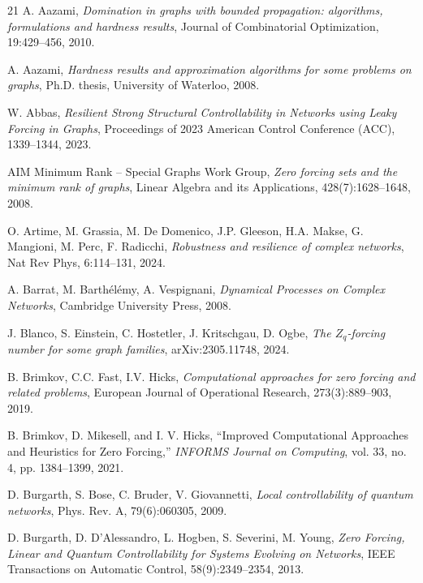 \documentclass[11pt]{article}
\theoremstyle{plain}
\theoremstyle{definition}
\theoremstyle{remark}
\begin{document}
\begin{thebibliography}{21}
A. Aazami, 
\textit{Domination in graphs with bounded propagation: algorithms, formulations and hardness results}, 
Journal of Combinatorial Optimization, 19:429--456, 2010.

A. Aazami, 
\textit{Hardness results and approximation algorithms for some problems on graphs}, 
Ph.D. thesis, University of Waterloo, 2008.

W. Abbas,
\textit{Resilient Strong Structural Controllability in Networks using Leaky Forcing in Graphs}, 
Proceedings of 2023 American Control Conference (ACC), 1339--1344, 2023.

AIM Minimum Rank – Special Graphs Work Group, 
\textit{Zero forcing sets and the minimum rank of graphs}, 
Linear Algebra and its Applications, 428(7):1628--1648, 2008.

O. Artime, M. Grassia, M. De Domenico, J.P. Gleeson, H.A. Makse, G. Mangioni, M. Perc, F. Radicchi,
\textit{Robustness and resilience of complex networks}, 
Nat Rev Phys, 6:114--131, 2024.

A. Barrat, M. Barthélémy, A. Vespignani, 
\textit{Dynamical Processes on Complex Networks}, 
Cambridge University Press, 2008.

J. Blanco, S. Einstein, C. Hostetler, J. Kritschgau, D. Ogbe, 
\textit{The $Z_q$-forcing number for some graph families}, 
arXiv:2305.11748, 2024.

B. Brimkov, C.C. Fast, I.V. Hicks,
\textit{Computational approaches for zero forcing and related problems}, 
European Journal of Operational Research, 273(3):889--903, 2019.

B. Brimkov, D. Mikesell, and I. V. Hicks, ``Improved Computational Approaches and Heuristics for Zero Forcing,'' \emph{INFORMS Journal on Computing}, vol. 33, no. 4, pp. 1384--1399, 2021.

D. Burgarth, S. Bose, C. Bruder, V. Giovannetti, 
\textit{Local controllability of quantum networks}, 
Phys. Rev. A, 79(6):060305, 2009.

D. Burgarth, D. D'Alessandro, L. Hogben, S. Severini, M. Young, 
\textit{Zero Forcing, Linear and Quantum Controllability for Systems Evolving on Networks}, 
IEEE Transactions on Automatic Control, 58(9):2349--2354, 2013.


\end{thebibliography}
\end{document}
